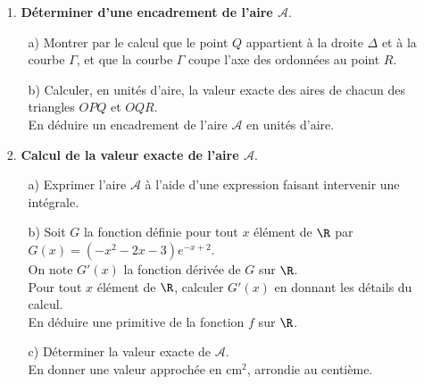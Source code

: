 \begin{itemize}
\item[1.] \textbf{Déterminer d'une encadrement de l'aire $\mathcal{A}$}. \\

\begin{itemize}
\item[a)] Montrer par le calcul que le point $Q$ appartient à la droite $\Delta$ et à la courbe $\Gamma$, et que la courbe $\Gamma$ coupe l'axe des ordonnées au point $R$. \\

\item[b)] Calculer, en unités d'aire, la valeur exacte des aires de chacun des triangles $OPQ$ et $OQR$. \\
En déduire un encadrement de l'aire $\mathcal{A}$ en unités d'aire. \\
\end{itemize}

\item[2.] \textbf{Calcul de la valeur exacte de l'aire $\mathcal{A}$}. \\

\begin{itemize}
\item[a)] Exprimer l'aire $\mathcal{A}$ à l'aide d'une expression faisant intervenir une intégrale. \\

\item[b)] Soit $G$ la fonction définie pour tout $x$ élément de $\R$ par $G(x) = \left(-x^2 -2x - 3\right)e^{-x+2}$. \\
On note $G'(x)$ la fonction dérivée de $G$ sur $\R$. \\
Pour tout $x$ élément de $\R$, calculer $G'(x)$ en donnant les détails du calcul. \\
En déduire une primitive de la fonction $f$ sur $\R$. \\

\item[c)] Déterminer la valeur exacte de $\mathcal{A}$. \\ En donner une valeur approchée en $\mathrm{cm}^2$, arrondie au centième. 
\end{itemize}

\vspace*{-10cm}

\end{itemize}

\newpage

